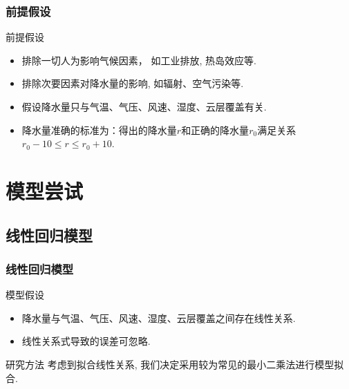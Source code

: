 \documentclass[10pt]{beamer}
\begin{document}
\begin{frame}
	\frametitle{前提假设}
	\begin{block}{前提假设}
		\begin{itemize}
			\item 排除一切人为影响气候因素， 如工业排放, 热岛效应等.
			\item 排除次要因素对降水量的影响, 如辐射、空气污染等.
			\item 假设降水量只与气温、气压、风速、湿度、云层覆盖有关.
			\item 降水量准确的标准为：得出的降水量$r$和正确的降水量$r_0$满足关系$r_0 - 10 \le r \le r_0 + 10$.
		\end{itemize}
	\end{block}
\end{frame}

\section{模型尝试}
\subsection{线性回归模型}
\begin{frame}
	\frametitle{线性回归模型}
	\begin{block}{模型假设}
		\begin{itemize}
			\item 降水量与气温、气压、风速、湿度、云层覆盖之间存在线性关系.
			\item 线性关系式导致的误差可忽略.
		\end{itemize}
	\end{block}

	\begin{block}{研究方法}
		考虑到拟合线性关系, 我们决定采用较为常见的最小二乘法进行模型拟合.
	\end{block}
\end{frame}
\end{document}
